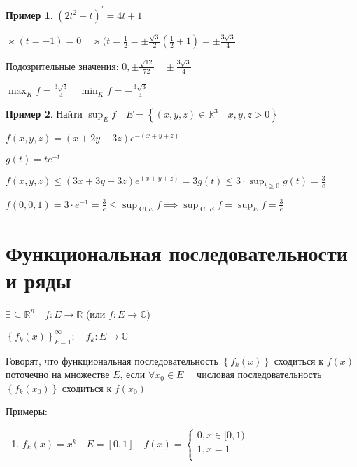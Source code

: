 \documentclass{book}
\newcommand\R{\ensuremath{\mathbb{R}}}
\renewcommand\C{\ensuremath{\mathbb{C}}}
\theoremstyle{definition}
\newtheorem*{example}{Пример}
\DeclareMathOperator{\Cl}{Cl}
\begin{document}
\begin{example}
$(2t^2+t)^{\prime} = 4t+1$

$\varkappa(t=-1) = 0\quad \varkappa(t = \frac{1}{2} = \pm \frac{\sqrt{3} }{2}\left( \frac{1}{2} + 1 \right) = \pm \frac{3\sqrt{3} }{4}$

    Подозрительные значения: $0, \pm \frac{\sqrt{12} }{72}\quad \pm \frac{3\sqrt{3} }{4}$ 

    $\max_K f = \frac{3\sqrt{3} }{4}\quad \min _K f = -\frac{3\sqrt{3} }{4}$
    \end{example}

    \begin{example}
        Найти $\sup_Ef\quad E = \left\{ (x,y,z)\in \R^3\quad x,y,z>0 \right\} $ 

        $f(x,y,z) = (x+2y+3z)e^{-(x+y+z)}$

        $g(t) = te^{-t}$

        $f(x,y,z)\leqslant (3x+3y+3z)e^{(x+y+z)} = 3g(t)\leqslant 3\cdot \sup_{t\geqslant 0} g(t) = \frac{3}{e}$ 

        $f(0,0,1) = 3 \cdot  e^{-1} = \frac{3}{e}\leqslant \sup_{\Cl E}f \implies \sup_{\Cl E}f = \sup_Ef = \frac{3}{e}$
    \end{example}

    \section{Функциональная последовательности и ряды}

    $\exists \subseteq \R^n\quad f: E\to \R$ (или $f:E\to \C$)

    $\left\{ f_k(x) \right\} _{k=1}^{\infty };\quad f_k: E\to \C$

    \begin{definition}
        Говорят, что функциональная последовательность $\left\{ f_k(x) \right\} $ сходиться к $f(x)$ поточечно на множестве  $E$, если  $\forall x_0\in E\quad$ числовая последовательность $\left\{ f_k(x_0) \right\} $ сходиться к $f(x_0)$ 
    \end{definition}

    Примеры:
    \begin{enumerate}
        \item $f_k(x) = x^k\quad E = [0,1]\quad f(x) = \begin{cases}
                0, x \in [0,1)\\
                1, x = 1\\
        \end{cases}$
    \end{enumerate}
\end{document}
